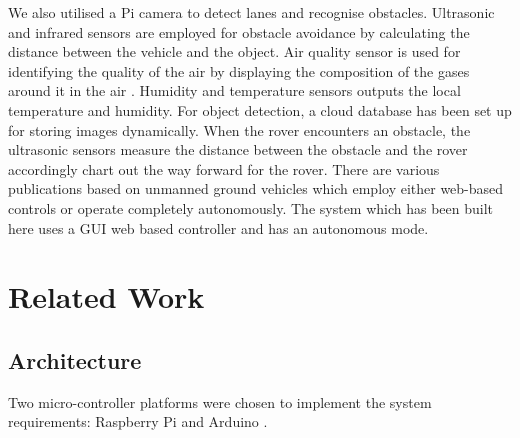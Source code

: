 \documentclass[conference,a4paper]{IEEEtran}
\begin{document}
We also utilised a Pi camera to detect lanes and recognise obstacles. Ultrasonic and infrared sensors are employed for obstacle avoidance by calculating the distance between the vehicle and the object\cite{9}. Air quality sensor is used for identifying the quality of the air by displaying the composition of the gases around it in the air \cite{3}. Humidity and temperature sensors outputs the local temperature and humidity. For object detection, a cloud database has been set up for storing images dynamically. When the rover encounters an obstacle, the ultrasonic sensors measure the distance between the obstacle and the rover accordingly chart out the way forward for the rover.
There are various publications based on unmanned ground vehicles which employ either web-based controls or operate completely autonomously. The system which has been built here uses a GUI web based controller and has an autonomous mode.
  
  
  


\section{Related Work}

\subsection{Architecture}
Two micro-controller platforms were chosen to implement the system requirements: Raspberry Pi and Arduino \cite{11}.
\end{document}
